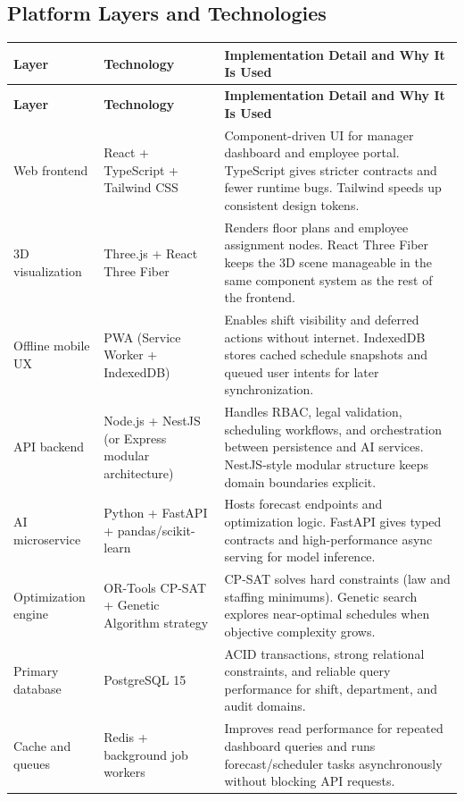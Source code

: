 \documentclass[11pt,a4paper]{article}
\newcommand{\thead}[1]{\textcolor{HeaderText}{\textbf{#1}}}
\begin{document}
\subsection{Platform Layers and Technologies}
\begin{longtable}{P{0.18\textwidth}P{0.24\textwidth}P{0.46\textwidth}}
\toprule
{}
\thead{Layer} & \thead{Technology} & \thead{Implementation Detail and Why It Is Used} \\
\midrule
\endfirsthead
\toprule
{}
\thead{Layer} & \thead{Technology} & \thead{Implementation Detail and Why It Is Used} \\
\midrule
\endhead
Web frontend & React + TypeScript + Tailwind CSS & Component-driven UI for manager dashboard and employee portal. TypeScript gives stricter contracts and fewer runtime bugs. Tailwind speeds up consistent design tokens. \\
3D visualization & Three.js + React Three Fiber & Renders floor plans and employee assignment nodes. React Three Fiber keeps the 3D scene manageable in the same component system as the rest of the frontend. \\
Offline mobile UX & PWA (Service Worker + IndexedDB) & Enables shift visibility and deferred actions without internet. IndexedDB stores cached schedule snapshots and queued user intents for later synchronization. \\
API backend & Node.js + NestJS (or Express modular architecture) & Handles RBAC, legal validation, scheduling workflows, and orchestration between persistence and AI services. NestJS-style modular structure keeps domain boundaries explicit. \\
AI microservice & Python + FastAPI + pandas/scikit-learn & Hosts forecast endpoints and optimization logic. FastAPI gives typed contracts and high-performance async serving for model inference. \\
Optimization engine & OR-Tools CP-SAT + Genetic Algorithm strategy & CP-SAT solves hard constraints (law and staffing minimums). Genetic search explores near-optimal schedules when objective complexity grows. \\
Primary database & PostgreSQL 15 & ACID transactions, strong relational constraints, and reliable query performance for shift, department, and audit domains. \\
Cache and queues & Redis + background job workers & Improves read performance for repeated dashboard queries and runs forecast/scheduler tasks asynchronously without blocking API requests. \\

\end{longtable}
\end{document}
